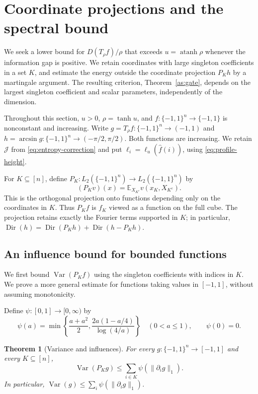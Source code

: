 \documentclass[11pt,letterpaper]{amsart}
\newcommand{\E}{\mathbb E}
\newcommand{\1}{\mathbf 1}
\DeclareMathOperator{\Var}{Var}
\DeclareMathOperator{\atanh}{atanh}
\newtheorem{theorem}{Theorem}[section]
\numberwithin{equation}{section}
\begin{document}
\section{Coordinate projections and the spectral bound}
\label{sec:coordinate-spectral}

We seek a lower bound for $D(T_\rho f)/\rho$ that exceeds
$u=\atanh\rho$ whenever the information gap is positive.
We retain coordinates with large singleton coefficients in a set
$K$, and estimate the energy outside the coordinate projection
$P_Kh$ by a martingale argument.
The resulting criterion, Theorem~\ref{as:gate}, depends on the
largest singleton coefficient and scalar parameters, independently
of the dimension.

Throughout this section, $u>0$, $\rho=\tanh u$, and
$f:\{-1,1\}^n\to\{-1,1\}$ is nonconstant and increasing.
Write $g=T_\rho f:\{-1,1\}^n\to(-1,1)$ and
$h=\arcsin g:\{-1,1\}^n\to(-\pi/2,\pi/2)$.
Both functions are increasing.
We retain $\mathcal J$ from \eqref{eq:entropy-correction} and put
$\ell_i=\ell_u(\widehat f(i))$, using \eqref{eq:profile-height}.

For $K\subseteq[n]$, define
$P_K:L_2(\{-1,1\}^n)\to L_2(\{-1,1\}^n)$ by
\begin{equation}\label{eq:coordinate-projection}
 (P_Kv)(x)=\E_{X_{K^c}}v(x_K,X_{K^c}).
\end{equation}
This is the orthogonal projection onto functions depending only
on the coordinates in $K$.
Thus $P_Kf$ is $f_K$ viewed as a function on the full cube.
The projection retains exactly the Fourier terms supported in $K$;
in particular,
$\operatorname{Dir}(h)
=\operatorname{Dir}(P_Kh)+\operatorname{Dir}(h-P_Kh)$.

\subsection{An influence bound for bounded functions}

We first bound $\Var(P_Kf)$ using the singleton coefficients
with indices in $K$.
We prove a more general estimate for functions taking values
in $[-1,1]$, without assuming monotonicity.

Define $\psi:[0,1]\to[0,\infty)$ by
\begin{equation}\label{eq:influence-cost}
 \psi(a)=\min\left\{
       \frac{a+a^2}{2},
       \frac{2a(1-a/4)}{\log(4/a)}
       \right\}\quad(0<a\le1),
 \qquad
 \psi(0)=0.
\end{equation}

\begin{theorem}[Variance and influences]\label{rt:source-projection}
For every $g:\{-1,1\}^n\to[-1,1]$ and every $K\subseteq[n]$,
\[
 \Var(P_Kg)\le\sum_{i\in K}\psi(\|\partial_i g\|_1).
\]
In particular, $\Var(g)\le\sum_i\psi(\|\partial_i g\|_1)$.
\end{theorem}
\end{document}
